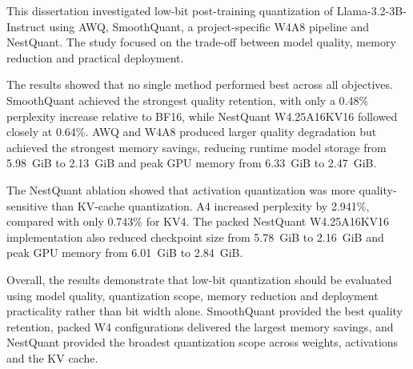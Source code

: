 \label{Conclusions} %




This dissertation investigated low-bit post-training quantization of
Llama-3.2-3B-Instruct using AWQ, SmoothQuant, a project-specific W4A8
pipeline and NestQuant. The study focused on the trade-off between model
quality, memory reduction and practical deployment.

The results showed that no single method performed best across all
objectives. SmoothQuant achieved the strongest quality retention, with
only a 0.48\% perplexity increase relative to BF16, while NestQuant
W4.25A16KV16 followed closely at 0.64\%. AWQ and W4A8 produced larger
quality degradation but achieved the strongest memory savings, reducing
runtime model storage from 5.98~GiB to 2.13~GiB and peak GPU memory from
6.33~GiB to 2.47~GiB.

The NestQuant ablation showed that activation quantization was more
quality-sensitive than KV-cache quantization. A4 increased perplexity by
2.941\%, compared with only 0.743\% for KV4. The packed NestQuant
W4.25A16KV16 implementation also reduced checkpoint size from 5.78~GiB
to 2.16~GiB and peak GPU memory from 6.01~GiB to 2.84~GiB.

Overall, the results demonstrate that low-bit quantization should be
evaluated using model quality, quantization scope, memory reduction and
deployment practicality rather than bit width alone. SmoothQuant provided
the best quality retention, packed W4 configurations delivered the
largest memory savings, and NestQuant provided the broadest quantization
scope across weights, activations and the KV cache.

